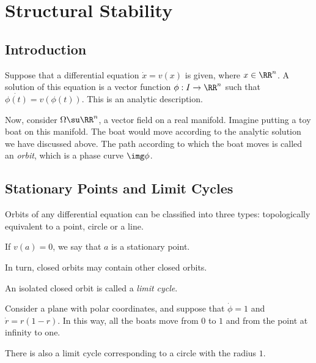 \documentclass[11pt]{scrartcl}
\begin{document}
  \section{Structural Stability}

  \subsection{Introduction}

  Suppose that a differential equation $\dot{x} = v(x)$ is given,
  where $x\in \RR^{n}$. A solution of this equation is a vector
  function $\phi: I \to \RR^{n}$ such that
  $\dot{\phi(t)} = v(\phi(t))$. This is an analytic description.

  Now, consider $\Omega \su \RR^{n}$, a vector field on a real
  manifold. Imagine putting a toy boat on this manifold. The boat
  would move according to the analytic solution we have discussed
  above. The path according to which the boat moves is called an
  \textit{orbit}, which is a phase curve $\img \phi$.

  \subsection{Stationary Points and Limit Cycles}

  Orbits of any differential equation can be classified into three
  types: topologically equivalent to a point, circle or a line.

  \begin{definition}
    If $v(a) = 0$, we say that $a$ is a stationary point.
  \end{definition}

  In turn, closed orbits may contain other closed orbits.

  \begin{definition}
    An isolated closed orbit is called a \textit{limit cycle}.
  \end{definition}

  \begin{example}

    Consider a plane with polar coordinates, and suppose that
    $\dot{\phi} = 1$ and $\dot{r} = r(1-r)$. In this way, all the
    boats move from $0$ to $1$ and from the point at infinity to one.

    There is also a limit cycle corresponding to a circle with the
    radius $1$.

  \end{example}
\end{document}
